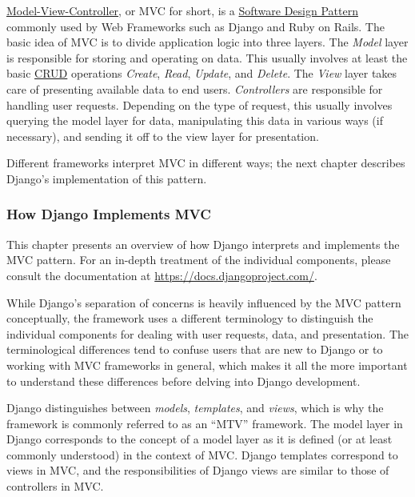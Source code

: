\href{https://en.wikipedia.org/wiki/Model_view_controller}{Model-View-Controller},
or MVC for short, is a
\href{https://en.wikipedia.org/wiki/Software_design_pattern}{Software
  Design Pattern} commonly used by Web Frameworks such as Django and
Ruby on Rails. The basic idea of MVC is to divide application logic
into three layers. The \emph{Model} layer is responsible for storing
and operating on data. This usually involves at least the basic
\href{https://en.wikipedia.org/wiki/CRUD}{CRUD} operations
\emph{Create}, \emph{Read}, \emph{Update}, and \emph{Delete}. The
\emph{View} layer takes care of presenting available data to end
users. \emph{Controllers} are responsible for handling user requests.
Depending on the type of request, this usually involves querying the
model layer for data, manipulating this data in various ways (if
necessary), and sending it off to the view layer for presentation.

Different frameworks interpret MVC in different ways; the next chapter
describes Django's implementation of this pattern.

\subsubsection{How Django Implements MVC}
\label{sec:django-mvc}

This chapter presents an overview of how Django interprets and
implements the MVC pattern. For an in-depth treatment of the
individual components, please consult the documentation at
\url{https://docs.djangoproject.com/}.

While Django's separation of concerns is heavily influenced by the MVC
pattern conceptually, the framework uses a different terminology to
distinguish the individual components for dealing with user requests,
data, and presentation. The terminological differences tend to confuse
users that are new to Django or to working with MVC frameworks in
general, which makes it all the more important to understand these
differences before delving into Django development.

Django distinguishes between \emph{models}, \emph{templates}, and
\emph{views}, which is why the framework is commonly referred to as an
``MTV'' framework. The model layer in Django corresponds to the
concept of a model layer as it is defined (or at least commonly
understood) in the context of MVC. Django templates correspond to
views in MVC, and the responsibilities of Django views are similar to
those of controllers in MVC.

